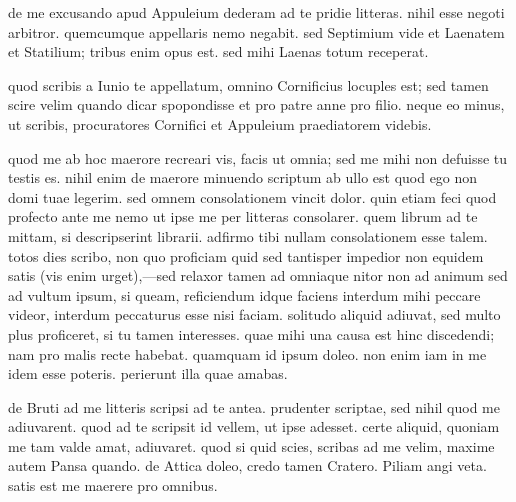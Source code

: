 


 de me excusando apud Appuleium dederam ad te pridie litteras. nihil esse negoti arbitror. quemcumque appellaris nemo negabit. sed Septimium vide et Laenatem et Statilium; tribus enim opus est. sed mihi Laenas totum receperat.

 quod scribis a Iunio te appellatum, omnino Cornificius locuples est; sed tamen scire velim quando dicar spopondisse et pro patre anne pro filio. neque eo minus, ut scribis, procuratores Cornifici et Appuleium praediatorem videbis.

 quod me ab hoc maerore recreari vis, facis ut omnia; sed me mihi non defuisse tu testis es. nihil enim de maerore minuendo scriptum ab ullo est quod ego non domi tuae legerim. sed omnem consolationem vincit dolor. quin etiam feci quod profecto ante me nemo ut ipse me per litteras consolarer. quem librum ad te mittam, si descripserint librarii. adfirmo tibi nullam consolationem esse talem. totos dies scribo, non quo proficiam quid sed tantisper impedior non equidem satis (vis enim urget),—sed relaxor tamen ad omniaque nitor non ad animum sed ad vultum ipsum, si queam, reficiendum idque faciens interdum mihi peccare videor, interdum peccaturus esse nisi faciam. solitudo aliquid adiuvat, sed multo plus proficeret, si tu tamen interesses. quae mihi una causa est hinc discedendi; nam pro malis recte habebat. quamquam id ipsum doleo. non enim iam in me idem esse poteris. perierunt illa quae amabas.

 de Bruti ad me litteris scripsi ad te antea. prudenter scriptae, sed nihil quod me adiuvarent. quod ad te scripsit id vellem, ut ipse adesset. certe aliquid, quoniam me tam valde amat, adiuvaret. quod si quid scies, scribas ad me velim, maxime autem Pansa quando. de Attica doleo, credo tamen Cratero. Piliam angi veta. satis est me maerere pro omnibus.
